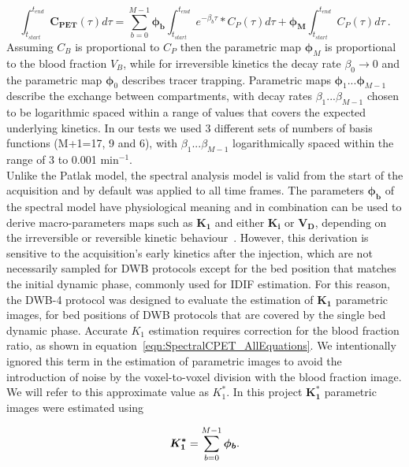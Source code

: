 \begin{equation} \label{SpectralEq}
\int_{t_{start}}^{t_{end}} \boldsymbol{C_{PET}}(\tau) d\tau =  \sum_{b=0}^{M-1}  \boldsymbol{\phi_b} \int_{t_{start}}^{t_{end}} e^{-\beta_b \tau} \ast C_P(\tau)  d\tau +\boldsymbol{\phi_M} \int_{t_{start}}^{t_{end}} C_{P}(\tau) d\tau   \ .
\end{equation}
Assuming $C_{B}$ is proportional to $C_{P}$ then the parametric map $\boldsymbol\phi_M$ is proportional to the blood fraction $V_B$, while for irreversible kinetics the decay rate $\beta_0\xrightarrow{}0$ and the parametric map $\boldsymbol\phi_0$ describes tracer trapping. Parametric maps $\boldsymbol{\phi}_1 ... \boldsymbol{\phi}_{M-1}$ describe the exchange between compartments, with decay rates $\beta_1 ... \beta_{M-1}$
chosen to be logarithmic spaced within a range of values that covers the expected underlying kinetics. 
In our tests we used 3 different sets of numbers of basis functions (M+1=17, 9 and 6), with $\beta_1 ... \beta_{M-1}$ logarithmically spaced within the range of 3 to 0.001 $\mathrm{min}^{-1}$. \\
Unlike the Patlak model, the spectral analysis model is valid from the start of the acquisition and by default was applied to all time frames. The parameters $\boldsymbol{\phi_b}$ of the spectral model have physiological meaning and in combination can be used to derive macro-parameters maps such as $\boldsymbol{K_1}$ and either $\boldsymbol{K_i}$ or $\boldsymbol{V_D}$, 
depending on the irreversible or reversible kinetic behaviour~\cite{Gunn2002}.
However, this derivation is sensitive to the acquisition's early kinetics after the injection, which are not necessarily sampled for DWB protocols except for the bed position that matches the initial dynamic phase, commonly used for IDIF estimation. 
For this reason, the DWB-4 protocol was designed to evaluate the estimation of $\boldsymbol{K_1}$ parametric images, for bed positions of DWB protocols that are covered by the single bed dynamic phase. Accurate $K_1$ estimation requires correction for the blood fraction ratio, as shown in equation~\ref{eqn:SpectralCPET_AllEquations}. We intentionally ignored this term in the estimation of parametric images to avoid the introduction of noise by the voxel-to-voxel division with the blood fraction image. We will refer to this approximate value as $K_1^*$. In this project $\boldsymbol{K_1^*}$ parametric images were estimated using

\begin{equation} \label{SpectralK1}
\boldsymbol{K_1^*} = \sum_{b=0}^{M-1} \boldsymbol{\phi_b} \\ . \\
\end{equation}

